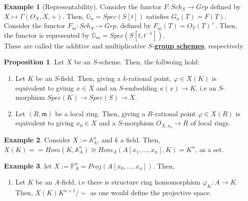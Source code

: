 \documentclass{article}
\theoremstyle{definition}
\theoremstyle{definition}
\theoremstyle{definition}
\theoremstyle{definition}
\newtheorem{proposition}{Proposition}[theorem]
\theoremstyle{definition}
\theoremstyle{definition}
\theoremstyle{definition}
\newtheorem{example}{Example}[theorem]
\begin{document}
\begin{tcolorbox}[colback=yellow!5!white,colframe=yellow!30!white]
\begin{example}[Representability]
Consider the functor $F: Sch_S\to Grp$ defined by $X\mapsto \Gamma(O_X,X,+)$. Then, $\mathbb{G}_a= Spec(S[t])$ satisfies $G_a(T)=F(T)$. \\

Consider the functor $F_m: Sch_S\to Grp$, defined by $F_m(T)=O_T(T)^{\times}$. Then, the functor is represented by $\mathbb{G}_m= Spec(S[t,t^{-1}])$. 
\\

These are called the additive and multiplicative $S$-\underline{\textbf{group schemes}}, respectively. 
\end{example}
\end{tcolorbox}



\begin{tcolorbox}[colback=blue!5!white,colframe=blue!30!white]
\begin{proposition}
Let $X$ be an $S$-scheme. Then, the follwoing hold:
\begin{enumerate}
    \item Let $K$ be an $S$-field. Then, giving a $k$-rational point, $\varphi\in X(K)$ is equivalent to gvinig $x\in X$ and an $S$-embedding $\kappa(x)\to K$, i.e an $S$-morphism $Spec(K)\to Spec(S)\to X$. 
    \item Let $(R,\mathfrak{m})$ be a local ring. Then, giving a $R$-rational point $\varphi\in X(R)$ is equivalent to giving $x_0\in X$ and a $S$-morphism $O_{X,x_0}\to R$ of local rings. 
\end{enumerate}
\end{proposition}
\end{tcolorbox}


\begin{tcolorbox}[colback=yellow!5!white,colframe=yellow!30!white]
\begin{example}
Consider $X:= \mathbb{A}^n_A$, and $k$ a field. Then, $X(K)== Hom(K, \mathbb{A}_A^n)\cong Hom_A(A[x_1,...,x_n], K)= K^n$, as a set. 
\end{example}
\end{tcolorbox}


\begin{tcolorbox}[colback=yellow!5!white,colframe=yellow!30!white]
\begin{example}
let $X:= \mathbb{P}^n_A=Proj(A[x_0,...,x_n])$. Then, 
\begin{enumerate}
    \item Let $K$ be an $A$-field, i.e there is structure ring homomorphism $\varphi_K: A\to K$. Then, $X(K)K^{n+1}/\sim$ as one would define the projective space. 
\end{enumerate}
\end{example}
\end{tcolorbox}
\end{document}
